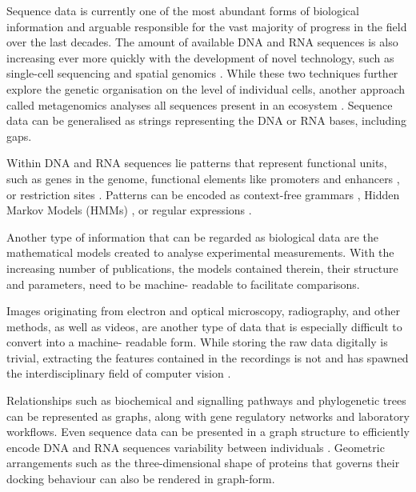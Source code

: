 \noindent
Sequence data\label{mar:dataseq} is currently one of
the most abundant forms of biological information and arguable responsible for
the vast majority of progress in the field over the last decades. The amount
of available DNA and RNA sequences is also increasing ever more quickly with
the development of novel technology, such as single-cell sequencing \citep{%
Wang2015} and spatial genomics \citep{Turczyk2020}. While these two techniques
further explore the genetic organisation on the level of individual cells,
another approach called metagenomics analyses all sequences present in an
ecosystem \citep{Venter2004,Hugenholtz2008}. Sequence data can be generalised
as strings representing the DNA or RNA bases, including gaps.
\medbreak

\noindent
Within\label{mar:datapatterns} DNA and RNA sequences lie
patterns that represent functional units, such as genes in the genome,
functional elements like promoters and enhancers \citep{Kim2015a}, or
restriction sites \citep{Smith1976}. Patterns can be encoded as context-free
grammars \citep{Hopcroft2001}, Hidden Markov Models (HMMs) \citep{Stamp2021},
or regular expressions \citep{Wang2019}.
\medbreak

\noindent
Another\label{mar:datamodels} type of information that can
be regarded as biological data are the mathematical models created to analyse
experimental measurements. With the increasing number of publications, the
models contained therein, their structure and parameters, need to be machine-
readable to facilitate comparisons.
\medbreak

\noindent
Images\label{mar:dataimages} originating from electron and
optical microscopy, radiography, and other methods, as well as videos, are
another type of data that is especially difficult to convert into a machine-%
readable form. While storing the raw data digitally is trivial, extracting the
features contained in the recordings is not and has spawned the
interdisciplinary field of computer vision \citep{Ballard1982}.
\medbreak

\noindent
Relationships\label{mar:datagraphs} such as biochemical and
signalling pathways and phylogenetic trees can be represented as graphs, along
with gene regulatory networks and laboratory workflows. Even sequence data can
be presented in a graph structure to efficiently encode DNA and RNA sequences
variability between individuals \citep{Novak2017}. Geometric arrangements such
as the three-dimensional shape of proteins that governs their docking
behaviour can also be rendered in graph-form.
\medbreak

